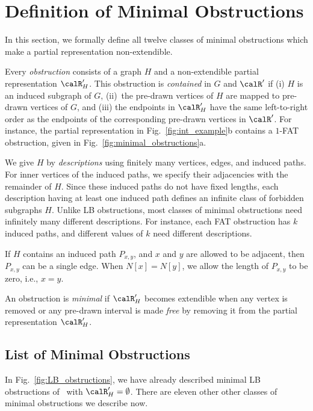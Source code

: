 \section{Definition of Minimal Obstructions} \label{sec:definition_of_obstructions}

In this section, we formally define all twelve classes of minimal obstructions which make a partial
representation non-extendible. 

Every \emph{obstruction} consists of a graph $H$ and a non-extendible partial representation $\calR'_H$.
This obstruction is \emph{contained} in $G$ and $\calR'$ if (i) $H$
is an induced subgraph of $G$, (ii)~the pre-drawn vertices of $H$ are mapped to pre-drawn vertices of
$G$, and (iii) the endpoints in $\calR'_H$ have the same left-to-right order as the endpoints of the
corresponding pre-drawn vertices in $\calR'$. For instance, the partial representation in
Fig.~\ref{fig:int_example}b contains a $1$-FAT obstruction, given in Fig.~\ref{fig:minimal_obstructions}a.

We give $H$ by \emph{descriptions} using finitely many vertices, edges, and induced paths. For inner
vertices of the induced paths, we specify their adjacencies with the remainder of $H$. Since these
induced paths do not have fixed lengths, each description having at least one induced path defines
an infinite class of forbidden subgraphs $H$. Unlike LB obstructions, most classes of minimal
obstructions need infinitely many different descriptions. For instance, each FAT obstruction has $k$
induced paths, and different values of $k$ need different descriptions.

If $H$ contains an induced path $P_{x,y}$, and $x$ and $y$ are allowed to be adjacent, then
$P_{x,y}$ can be a single edge.  When $N[x] = N[y]$, we allow the length of $P_{x,y}$ to be zero,
i.e., $x=y$.

 An obstruction is \emph{minimal} if $\calR'_H$ becomes extendible when any
vertex is removed or any pre-drawn interval is made \emph{free} by removing it from the partial
representation $\calR'_H$. 

\subsection{List of Minimal Obstructions}

In Fig.~\ref{fig:LB_obstructions}, we have already described minimal LB obstructions
of~\cite{lb_graphs} with $\calR'_H = \emptyset$.  There are eleven other other classes of minimal
obstructions we describe now. 

